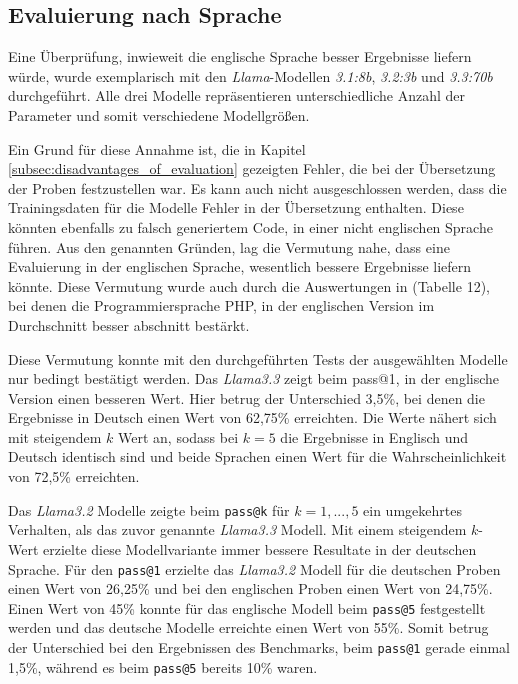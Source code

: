 \subsection{Evaluierung nach Sprache}
Eine Überprüfung, inwieweit die englische Sprache besser Ergebnisse liefern würde, wurde exemplarisch mit den \textit{Llama}-Modellen \textit{3.1:8b}, \textit{3.2:3b} und \textit{3.3:70b} durchgeführt. Alle drei Modelle repräsentieren unterschiedliche Anzahl der Parameter und somit verschiedene Modellgrößen.\vspace{0.2cm}

Ein Grund für diese Annahme ist, die in Kapitel \ref{subsec:disadvantages_of_evaluation} gezeigten Fehler, die bei der Übersetzung der Proben festzustellen war.
Es kann auch nicht ausgeschlossen werden, dass die Trainingsdaten für die Modelle Fehler in der Übersetzung enthalten. Diese könnten ebenfalls zu falsch generiertem Code, in einer nicht englischen Sprache führen. Aus den genannten Gründen, lag die Vermutung nahe, dass eine Evaluierung in der englischen Sprache, wesentlich bessere Ergebnisse liefern könnte. Diese Vermutung wurde auch durch die Auswertungen in \cite[][11]{peng-2024} (Tabelle 12), bei denen die Programmiersprache PHP, in der englischen Version im Durchschnitt besser abschnitt bestärkt.\vspace{0.2cm}

Diese Vermutung konnte mit den durchgeführten Tests der ausgewählten Modelle nur bedingt bestätigt werden. Das \textit{Llama3.3} zeigt beim pass@1, in der englische Version einen besseren Wert. Hier betrug der Unterschied 3,5\%, bei denen die Ergebnisse in Deutsch einen Wert von 62,75\% erreichten. Die Werte nähert sich mit steigendem $k$ Wert an, sodass bei $k=5$ die Ergebnisse in Englisch und Deutsch identisch sind und beide Sprachen einen Wert für die Wahrscheinlichkeit von 72,5\% erreichten.\vspace{0.2cm}

Das \textit{Llama3.2} Modelle zeigte beim \texttt{pass@k} für $k=1,...,5$ ein umgekehrtes Verhalten, als das zuvor genannte \textit{Llama3.3} Modell. Mit einem steigendem $k$-Wert erzielte diese Modellvariante immer bessere Resultate in der deutschen Sprache. Für den \texttt{pass@1} erzielte das \textit{Llama3.2} Modell für die deutschen Proben einen Wert von 26,25\% und bei den englischen Proben einen Wert von 24,75\%. Einen Wert von 45\% konnte für das englische Modell beim \texttt{pass@5} festgestellt werden und das deutsche Modelle erreichte einen Wert von 55\%. Somit betrug der Unterschied bei den Ergebnissen des Benchmarks, beim \texttt{pass@1} gerade einmal 1,5\%, während es beim \texttt{pass@5} bereits 10\% waren.\vspace{0.2cm}

